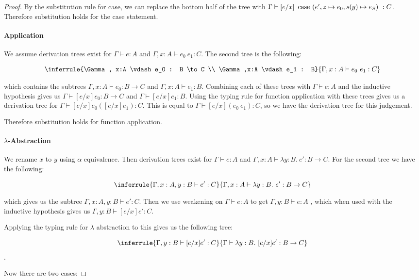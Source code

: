 \begin{proof}
By the substitution rule for case, we can replace the bottom half of the tree with $\Gamma \vdash [e/x] \ \operatorname{case} \ (e', z \mapsto e_0 , s(y) \mapsto e_S) \  : C$. Therefore substitution holds for the case statement. 

\paragraph{Application} We assume derivation trees exist for $\Gamma \vdash e : A$ and $\Gamma, x : A \vdash e_0 \ e_1 : C$. The second tree is the following:

$$
\inferrule{\Gamma , x:A \vdash e_0 : B \to C \\  \Gamma ,x:A \vdash e_1 : B}
  {\Gamma, x : A \vdash e_0 \ e_1 : C}$$

which contains the subtrees $\Gamma, x:A \vdash e_0 : B \to C$ and $\Gamma, x:A \vdash e_1 : B$. Combining each of these trees with $\Gamma \vdash e : A$ and the inductive hypothesis gives us $\Gamma \vdash [e/x]e_0 : B \to C$ and $\Gamma \vdash [e/x]e_1 : B$. Using the typing rule for function application with these trees gives us a derivation tree for $\Gamma \vdash [e/x]e_0 ([e/x]e_1) : C$. This is equal to $\Gamma \vdash [e/x](e_0 \ e_1) : C$, so we have the derivation tree for this judgement.

Therefore substitution holds for function application.

\paragraph{$\lambda$-Abstraction} We rename $x$ to $y$ using $\alpha$ equivalence. Then derivation trees exist for $\Gamma \vdash e : A$ and $\Gamma, x : A \vdash \lambda y : B. \ e' : B \to C$. For the second tree we have the following:

$$\inferrule{\Gamma, x : A, y : B \vdash e' : C}{\Gamma, x:A \vdash \lambda y:B. \ e' : B \to C}$$

which gives us the subtree $\Gamma, x : A, y : B \vdash e' : C$. Then we use weakening on $\Gamma \vdash e : A$ to get $\Gamma, y : B \vdash e : A$
, which when used with the inductive hypothesis gives us $\Gamma, y : B \vdash [e/x]e' : C$. 


Applying the typing rule for $\lambda$ abstraction to this gives us the following tree:

$$\inferrule{\Gamma, y : B \vdash [e/x]e' : C}{\Gamma \vdash \lambda y:B. \ [e/x]e' : B \to C}$$.

Now there are two cases:


\end{proof}
